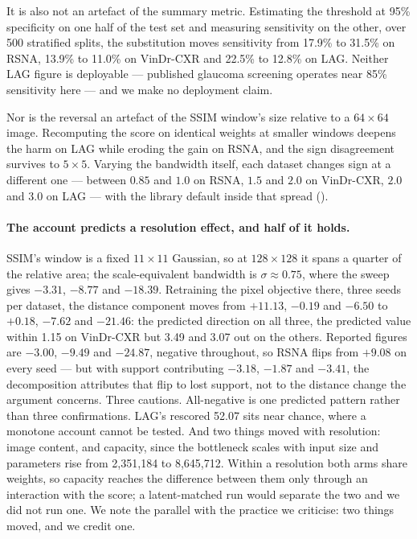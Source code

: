 \documentclass[pmlr,twocolumn,10pt]{jmlr} %
\begin{document}
It is also not an artefact of the summary metric. Estimating the threshold at 95\%
specificity on one half of the test set and measuring sensitivity on the other, over 500
stratified splits, the substitution moves sensitivity from 17.9\% to 31.5\% on RSNA, 13.9\%
to 11.0\% on VinDr-CXR and 22.5\% to 12.8\% on LAG. Neither LAG figure is deployable ---
published glaucoma screening operates near 85\% sensitivity here --- and we make no
deployment claim.

Nor is the reversal an artefact of the SSIM window's size relative to a $64\times64$ image.
Recomputing the score on identical weights at smaller windows deepens the harm on LAG while
eroding the gain on RSNA, and the sign disagreement survives to $5\times5$. Varying the
bandwidth itself, each dataset changes sign at a different one --- between $0.85$ and $1.0$
on RSNA, $1.5$ and $2.0$ on VinDr-CXR, $2.0$ and $3.0$ on LAG --- with the library default
inside that spread ().

\paragraph*{The account predicts a resolution effect, and half of it holds.}
\label{sec:res128}
SSIM's window is a fixed $11\times11$ Gaussian, so at $128\times128$ it spans a quarter of
the relative area; the scale-equivalent bandwidth is $\sigma{\approx}0.75$, where the sweep
gives $-3.31$, $-8.77$ and $-18.39$. Retraining the pixel objective there, three seeds per
dataset, the distance component moves from $+11.13$, $-0.19$ and $-6.50$ to $+0.18$, $-7.62$
and $-21.46$: the predicted direction on all three, the predicted value within 1.15 on
VinDr-CXR but 3.49 and 3.07 out on the others. Reported figures are $-3.00$, $-9.49$ and
$-24.87$, negative throughout, so RSNA flips from $+9.08$ on every seed --- but with support
contributing $-3.18$, $-1.87$ and $-3.41$, the decomposition attributes that flip to lost
support, not to the distance change the argument concerns. Three cautions. All-negative is one predicted
pattern rather than three confirmations. LAG's rescored 52.07 sits near chance, where a
monotone account cannot be tested. And two things moved with resolution: image content, and
capacity, since the bottleneck scales with input size and parameters rise from 2{,}351{,}184
to 8{,}645{,}712. Within a resolution both arms share weights, so capacity reaches the
difference between them only through an interaction with the score; a latent-matched run
would separate the two and we did not run one. We note the parallel with the practice we
criticise: two things moved, and we credit one.
\end{document}
